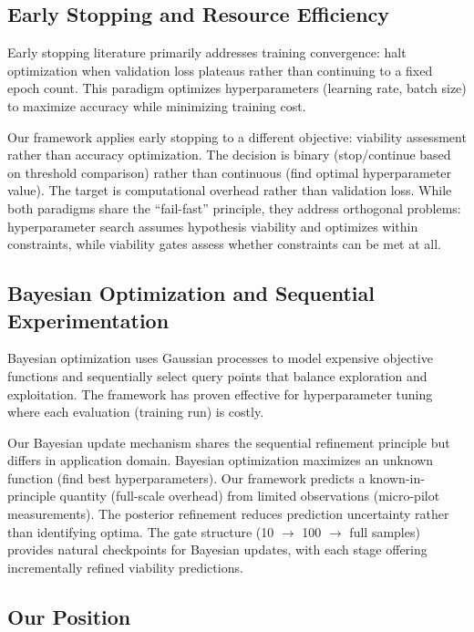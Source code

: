 \subsection{Early Stopping and Resource Efficiency}

Early stopping literature primarily addresses training convergence: halt optimization when validation loss plateaus rather than continuing to a fixed epoch count. This paradigm optimizes hyperparameters (learning rate, batch size) to maximize accuracy while minimizing training cost.

Our framework applies early stopping to a different objective: viability assessment rather than accuracy optimization. The decision is binary (stop/continue based on threshold comparison) rather than continuous (find optimal hyperparameter value). The target is computational overhead rather than validation loss. While both paradigms share the ``fail-fast'' principle, they address orthogonal problems: hyperparameter search assumes hypothesis viability and optimizes within constraints, while viability gates assess whether constraints can be met at all.

\subsection{Bayesian Optimization and Sequential Experimentation}

Bayesian optimization uses Gaussian processes to model expensive objective functions and sequentially select query points that balance exploration and exploitation. The framework has proven effective for hyperparameter tuning where each evaluation (training run) is costly.

Our Bayesian update mechanism shares the sequential refinement principle but differs in application domain. Bayesian optimization maximizes an unknown function (find best hyperparameters). Our framework predicts a known-in-principle quantity (full-scale overhead) from limited observations (micro-pilot measurements). The posterior refinement reduces prediction uncertainty rather than identifying optima. The gate structure (10 $\rightarrow$ 100 $\rightarrow$ full samples) provides natural checkpoints for Bayesian updates, with each stage offering incrementally refined viability predictions.

\subsection{Our Position}

